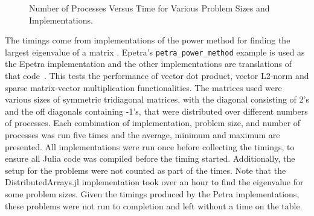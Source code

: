 \documentclass[acmsmall]{acmart}
\begin{document}
	\begin{figure}
		\caption{Number of Processes Versus Time for Various Problem Sizes and Implementations.}
		\label{fig:result-numproc}
	\end{figure}
	
	The timings come from implementations of the power method for finding the largest eigenvalue of a matrix
	\cite{Gu:2000:PowerMethod}.
	Epetra's \texttt{petra\_power\_method} example is used as the Epetra implementation and the other implementations are translations of that code~\cite{Heroux:2005:Trilinos}.
	This tests the performance of vector dot product, vector L2-norm and sparse matrix-vector multiplication functionalities.
	The matrices used were various sizes of symmetric tridiagonal matrices, with the diagonal consisting of 2's
	and the off diagonals containing -1's, that were distributed over different numbers of processes.
	Each combination of implementation, problem size, and number of processes was run five times and the average, minimum and maximum are presented.
	All implementations were run once before collecting the timings, to ensure all Julia code was
	compiled before the timing started.
	Additionally, the setup for the problems were not counted as part of the times.
	Note that the DistributedArrays.jl implementation took over an hour to find the eigenvalue for some problem sizes.
	Given the timings produced by the Petra implementations, these problems were not run to completion and left without a time on the table.
	
\end{document}
